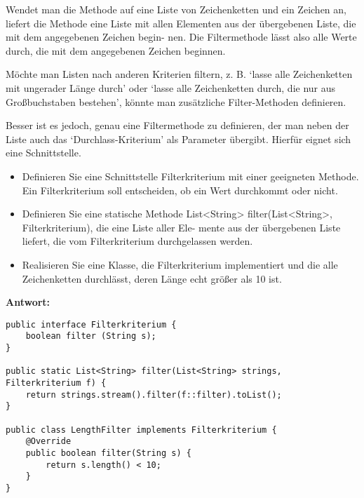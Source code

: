 Wendet man die Methode auf eine Liste von Zeichenketten und ein Zeichen an,
liefert die Methode eine Liste mit allen Elementen aus der übergebenen Liste,
die mit dem angegebenen Zeichen begin- nen. Die Filtermethode lässt also alle
Werte durch, die mit dem angegebenen Zeichen beginnen.

Möchte man Listen nach anderen Kriterien filtern, z. B. `lasse alle
Zeichenketten mit ungerader Länge durch' oder `lasse alle Zeichenketten durch,
die nur aus Großbuchstaben bestehen', könnte man zusätzliche Filter-Methoden
definieren.

Besser ist es jedoch, genau eine Filtermethode zu definieren, der man neben der
Liste auch das `Durchlass-Kriterium' als Parameter übergibt. Hierfür eignet
sich eine Schnittstelle.

\begin{itemize}
    \item Definieren Sie eine Schnittstelle Filterkriterium mit einer geeigneten Methode.
          Ein Filterkriterium soll entscheiden, ob ein Wert durchkommt oder nicht.
    \item Definieren Sie eine statische Methode List<String> filter(List<String>,
          Filterkriterium), die eine Liste aller Ele- mente aus der übergebenen Liste
          liefert, die vom Filterkriterium durchgelassen werden.
    \item Realisieren Sie eine Klasse, die Filterkriterium implementiert und die alle
          Zeichenketten durchlässt, deren Länge echt größer als 10 ist.
\end{itemize}

\textbf{Antwort:}

\begin{lstlisting}
public interface Filterkriterium {
    boolean filter (String s);
}

public static List<String> filter(List<String> strings, Filterkriterium f) {
    return strings.stream().filter(f::filter).toList();
}

public class LengthFilter implements Filterkriterium {
    @Override
    public boolean filter(String s) {
        return s.length() < 10;
    }
}
\end{lstlisting}